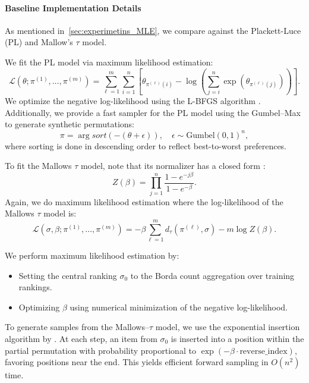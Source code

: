 \documentclass{article}
\begin{document}
\paragraph{Baseline Implementation Details}
As mentioned in~\ref{sec:experimetins_MLE}, we compare against the Plackett-Luce (PL) and Mallow's $\tau$ model.


We fit the PL model via maximum likelihood estimation:
\begin{equation}
\label{eq:pl_loglik}
\mathcal{L}(\theta; \pi^{(1)},\ldots,\pi^{(m)}) = \sum_{\ell=1}^{m} \sum_{i=1}^{n} \left[ \theta_{\pi^{(\ell)}(i)} - \log \left( \sum_{j=i}^{n} \exp(\theta_{\pi^{(\ell)}(j)}) \right) \right].
\end{equation}
We optimize the negative log-likelihood using the L-BFGS algorithm \cite{liu1989limited}.  Additionally, we provide a fast sampler for the PL model using the Gumbel--Max \citep{yellott1977relationship, gumbelmax} to generate synthetic permutations:
\begin{equation}
\label{eq:gumbel}
\pi = \arg sort\left(-(\theta + \epsilon)\right), \quad \epsilon \sim \mathrm{Gumbel}(0,1)^n,
\end{equation}
where sorting is done in descending order to reflect best-to-worst preferences.

To fit the Mallows $\tau$ model, note that its  normalizer has a closed form \cite{fligner1986distance}:
\begin{equation*}
\label{eq:z_theta}
Z(\beta) = \prod_{j=1}^{n} \frac{1 - e^{-j \beta}}{1 - e^{-\beta}}.
\end{equation*}
Again, we do maximum likelihood estimation where the log-likelihood of the Mallows $\tau$ model is:
\begin{equation*}
\label{eq:mallows_loglik}
\mathcal{L}(\sigma, \beta; \pi^{(1)},\ldots,\pi^{(m)}) = -\beta \sum_{\ell=1}^{m} d_\tau(\pi^{(\ell)}, \sigma) - m \log Z(\beta).
\end{equation*}

We perform maximum likelihood estimation by:
\begin{itemize}
    \item Setting the central ranking \(\sigma_0\) to the Borda count aggregation over training rankings.
    \item Optimizing \(\beta\) using numerical minimization of the negative log-likelihood.
\end{itemize}
To generate samples from the Mallows--\(\tau\) model, we use the exponential insertion algorithm by \citep{lu2014effective}. At each step, an item from \(\sigma_0\) is inserted into a position within the partial permutation with probability proportional to \(\exp(-\beta \cdot \text{reverse\_index})\), favoring positions near the end. This yields efficient forward sampling in \(O(n^2)\) time.
\end{document}
